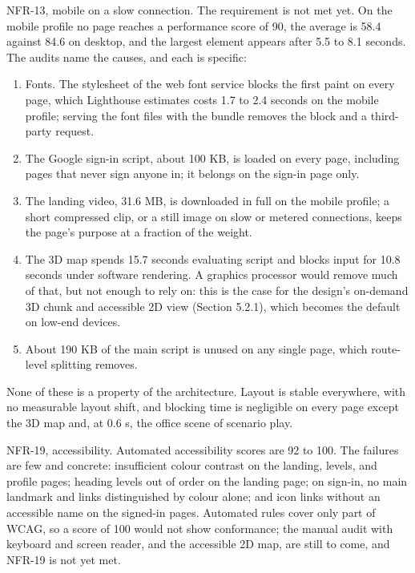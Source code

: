 NFR-13, mobile on a slow connection. The requirement is not met yet. On the mobile profile no page reaches a performance score of 90, the average is 58.4 against 84.6 on desktop, and the largest element appears after 5.5 to 8.1 seconds. The audits name the causes, and each is specific:

\begin{enumerate}[leftmargin=1.5em]
  \item Fonts. The stylesheet of the web font service blocks the first paint on every page, which Lighthouse estimates costs 1.7 to 2.4 seconds on the mobile profile; serving the font files with the bundle removes the block and a third-party request.
  \item The Google sign-in script, about 100 KB, is loaded on every page, including pages that never sign anyone in; it belongs on the sign-in page only.
  \item The landing video, 31.6 MB, is downloaded in full on the mobile profile; a short compressed clip, or a still image on slow or metered connections, keeps the page's purpose at a fraction of the weight.
  \item The 3D map spends 15.7 seconds evaluating script and blocks input for 10.8 seconds under software rendering. A graphics processor would remove much of that, but not enough to rely on: this is the case for the design's on-demand 3D chunk and accessible 2D view (Section 5.2.1), which becomes the default on low-end devices.
  \item About 190 KB of the main script is unused on any single page, which route-level splitting removes.
\end{enumerate}

None of these is a property of the architecture. Layout is stable everywhere, with no measurable layout shift, and blocking time is negligible on every page except the 3D map and, at 0.6 s, the office scene of scenario play.

NFR-19, accessibility. Automated accessibility scores are 92 to 100. The failures are few and concrete: insufficient colour contrast on the landing, levels, and profile pages; heading levels out of order on the landing page; on sign-in, no main landmark and links distinguished by colour alone; and icon links without an accessible name on the signed-in pages. Automated rules cover only part of WCAG\cite{r203}, so a score of 100 would not show conformance; the manual audit with keyboard and screen reader, and the accessible 2D map, are still to come, and NFR-19 is not yet met.

